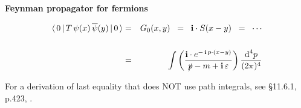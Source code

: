 
\begin{frame}{\headingColor\bf\LARGE Feynman propagator for fermions}

\vskip -0.5cm

\large
\begin{eqnarray*}
\langle\,0\,\vert\,T\,\psi(x)\,\overline{\psi}(y)\,\vert\,0\,\rangle
& = &
	G_{0}(x,y)
\;\; = \;\;
	\textnormal{\bf i} \cdot S(x - y)
\;\; = \;\;
	\cdots
\\ \\
& = &
	\int\left(
		\dfrac{
		\textnormal{\bf i}\cdot e^{-\,\textnormal{\bf i}\,p\cdot(x-y)}
		}{
		\slashed{p} - m + \textnormal{\bf i}\,\varepsilon
		}
		\right)
	\dfrac{\textnormal{d}^{4}p}{(2\pi)^{4}}
\end{eqnarray*}

\vskip 0.3cm
\small
For a derivation of last equality that does NOT use path integrals, see
\S11.6.1, p.423, \cite{DAuria2016}.

\end{frame}
\normalsize

